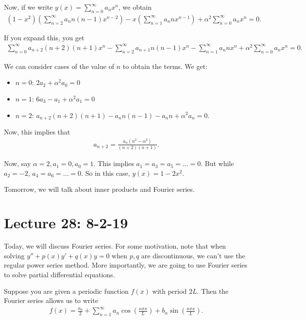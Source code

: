 \documentclass{article}
\begin{document}
Now, if we write $y(x) = \sum_{n=0}^{\infty} a_n x^n$, we obtain
\begin{align*}
  (1-x^2) \left( \sum_{n=2}^{\infty} a_n n (n-1) x^{n-2} \right) - x \left( \sum_{n=1}^{\infty} a_n n x^{n-1} \right) + \alpha^2 \sum_{n=0}^{\infty}a_n x^n = 0.
\end{align*}

If you expand this, you get
\begin{align*}
  \sum_{n=0}^{\infty} a_{n+2}(n+2)(n+1) x^n - \sum_{n=2}^{\infty} a_{n+1} n (n-1) x^n - \sum_{n=1}^{\infty} a_n n x^n +\alpha^2 \sum_{n=0}^{\infty} a_n x^n = 0.
\end{align*}

We can consider cases of the value of $n$ to obtain the terms.  We get:

\begin{itemize}
  \item $n = 0$: $2a_2 + \alpha^2 a_0 = 0$
  \item $n = 1$: $6a_3 - a_1 + \alpha^2 a_1 = 0$
  \item $n = 2$: $a_{n+2}(n+2)(n+1) - a_n n(n-1) - a_n n + \alpha^2 a_n = 0$.
\end{itemize}

Now, this implies that
\begin{align*}
  a_{n+2} = \frac{a_n (n^2 - \alpha^2)}{(n+2)(n+1)}.
\end{align*}

Now, say $\alpha = 2, a_1 = 0, a_0 = 1$.  This implies $a_1 = a_3 = a_5 = \dots = 0$.  But while $a_2 = -2$, $a_4 = a_6 = \dots = 0$.  So in this case, $y(x) = 1 - 2x^2$.

Tomorrow, we will talk about inner products and Fourier series.

\section{Lecture 28: 8-2-19}

Today, we will discuss Fourier series.  For some motivation, note that when solving $y'' + p(x) y' + q(x) y = 0 $ when $p, q$ are discontinuous, we can't use the regular power series method.  More importantly, we are going to use Fourier series to solve partial differential equations.

Suppose you are given a periodic function $f(x)$ with period $2L$.  Then the Fourier series allows us to write
\begin{align*}
  f(x) = \frac{a_0}{2} + \sum_{n=1}^{\infty} a_n \cos \left( \frac{n \pi x}{L} \right) + b_n \sin \left( \frac{n \pi x}{L} \right).
\end{align*}
\end{document}
